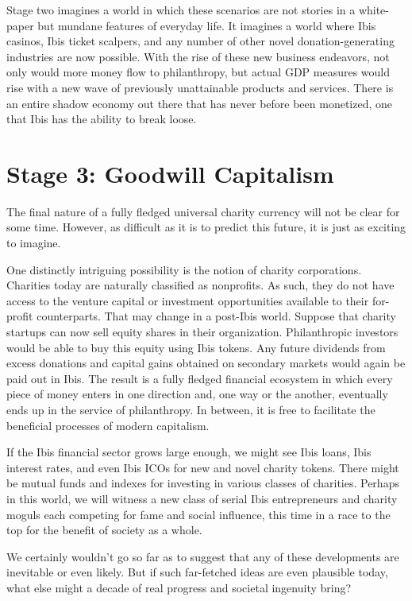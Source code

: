 \documentclass{article} \usepackage{parskip}
\begin{document}
Stage two imagines a world in which these scenarios are not stories in a
white-paper but mundane features of everyday life. It imagines a world where
Ibis casinos, Ibis ticket scalpers, and any number of other novel
donation-generating industries are now possible. With the rise of these new
business endeavors, not only would more money flow to philanthropy, but actual
GDP measures would rise with a new wave of previously unattainable products and
services. There is an entire shadow economy out there that has never before been
monetized, one that Ibis has the ability to break loose.

\section{Stage 3: Goodwill Capitalism}

The final nature of a fully fledged universal charity currency will not be clear
for some time. However, as difficult as it is to predict this future, it is just
as exciting to imagine.

One distinctly intriguing possibility is the notion of charity
corporations. Charities today are naturally classified as nonprofits. As such,
they do not have access to the venture capital or investment opportunities
available to their for-profit counterparts. That may change in a post-Ibis
world. Suppose that charity startups can now sell equity shares in their
organization. Philanthropic investors would be able to buy this equity using
Ibis tokens. Any future dividends from excess donations and capital gains
obtained on secondary markets would again be paid out in Ibis. The result is a
fully fledged financial ecosystem in which every piece of money enters in one
direction and, one way or the another, eventually ends up in the service of
philanthropy. In between, it is free to facilitate the beneficial processes of
modern capitalism.

If the Ibis financial sector grows large enough, we might see Ibis loans, Ibis
interest rates, and even Ibis ICOs for new and novel charity tokens. There might
be mutual funds and indexes for investing in various classes of
charities. Perhaps in this world, we will witness a new class of serial Ibis
entrepreneurs and charity moguls each competing for fame and social influence,
this time in a race to the top for the benefit of society as a whole.

We certainly wouldn't go so far as to suggest that any of these developments are
inevitable or even likely. But if such far-fetched ideas are even plausible
today, what else might a decade of real progress and societal ingenuity bring?
\end{document}
